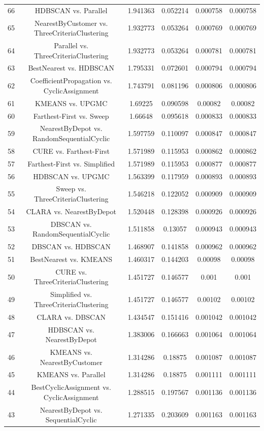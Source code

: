 \documentclass[a4paper,10pt]{article}
\begin{document}
\begin{landscape}
\begin{table}[!htp]
\begin{tabular}{cccccc}
66&HDBSCAN vs. Parallel&1.941363&0.052214&0.000758&0.000758\\
65&NearestByCustomer vs. ThreeCriteriaClustering&1.932773&0.053264&0.000769&0.000769\\
64&Parallel vs. ThreeCriteriaClustering&1.932773&0.053264&0.000781&0.000781\\
63&BestNearest vs. HDBSCAN&1.795331&0.072601&0.000794&0.000794\\
62&CoefficientPropagation vs. CyclicAssignment&1.743791&0.081196&0.000806&0.000806\\
61&KMEANS vs. UPGMC&1.69225&0.090598&0.00082&0.00082\\
60&Farthest-First vs. Sweep&1.66648&0.095618&0.000833&0.000833\\
59&NearestByDepot vs. RandomSequentialCyclic&1.597759&0.110097&0.000847&0.000847\\
58&CURE vs. Farthest-First&1.571989&0.115953&0.000862&0.000862\\
57&Farthest-First vs. Simplified&1.571989&0.115953&0.000877&0.000877\\
56&HDBSCAN vs. UPGMC&1.563399&0.117959&0.000893&0.000893\\
55&Sweep vs. ThreeCriteriaClustering&1.546218&0.122052&0.000909&0.000909\\
54&CLARA vs. NearestByDepot&1.520448&0.128398&0.000926&0.000926\\
53&DBSCAN vs. RandomSequentialCyclic&1.511858&0.13057&0.000943&0.000943\\
52&DBSCAN vs. HDBSCAN&1.468907&0.141858&0.000962&0.000962\\
51&BestNearest vs. KMEANS&1.460317&0.144203&0.00098&0.00098\\
50&CURE vs. ThreeCriteriaClustering&1.451727&0.146577&0.001&0.001\\
49&Simplified vs. ThreeCriteriaClustering&1.451727&0.146577&0.00102&0.00102\\
48&CLARA vs. DBSCAN&1.434547&0.151416&0.001042&0.001042\\
47&HDBSCAN vs. NearestByDepot&1.383006&0.166663&0.001064&0.001064\\
46&KMEANS vs. NearestByCustomer&1.314286&0.18875&0.001087&0.001087\\
45&KMEANS vs. Parallel&1.314286&0.18875&0.001111&0.001111\\
44&BestCyclicAssignment vs. CyclicAssignment&1.288515&0.197567&0.001136&0.001136\\
43&NearestByDepot vs. SequentialCyclic&1.271335&0.203609&0.001163&0.001163\\

\end{tabular}
\end{table}
\end{landscape}
\end{document}
